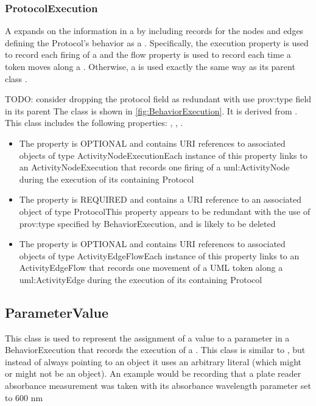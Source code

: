 \subsubsection{ProtocolExecution}%
\label{sec:labop:ProtocolExecution}%
A  expands on the information in a  by including records for
        the nodes and edges defining the Protocol's behavior as a . Specifically, the execution property
        is used to record each firing of a  and the flow property is used to record each time a token
        moves along a .
        Otherwise, a  is used exactly the same way as its parent class .

        TODO: consider dropping the protocol field as redundant with use prov:type field in its parent%
\newline%
\linebreak%
The  class is shown in \ref{fig:BehaviorExecution}. It is derived from .%
This class includes the following properties: , , . %
\begin{itemize}%
\item%
The  property is OPTIONAL and contains URI references to associated objects of type ActivityNodeExecutionEach instance of this property links to an ActivityNodeExecution that records one
        firing of a uml:ActivityNode during the execution of its containing Protocol%
\item%
The  property is REQUIRED and contains a URI reference to an associated object of type ProtocolThis property appears to be redundant with the use of prov:type specified by BehaviorExecution, and is likely to be deleted%
\item%
The  property is OPTIONAL and contains URI references to associated objects of type ActivityEdgeFlowEach instance of this property links to an ActivityEdgeFlow that records one movement of a UML
        token along a uml:ActivityEdge during the execution of its containing Protocol%
\end{itemize}%
\subsection{ParameterValue}%
\label{sec:labop:ParameterValue}%
This class is used to represent the assignment of a value to a parameter in a BehaviorExecution
        that records the execution of a . This class is similar to , but instead of always
        pointing to an object it uses an arbitrary literal (which might or might not be an object). An example would
        be recording that a plate reader absorbance measurement was taken with its absorbance wavelength parameter set
        to 600 nm%
\newline%
\linebreak%


